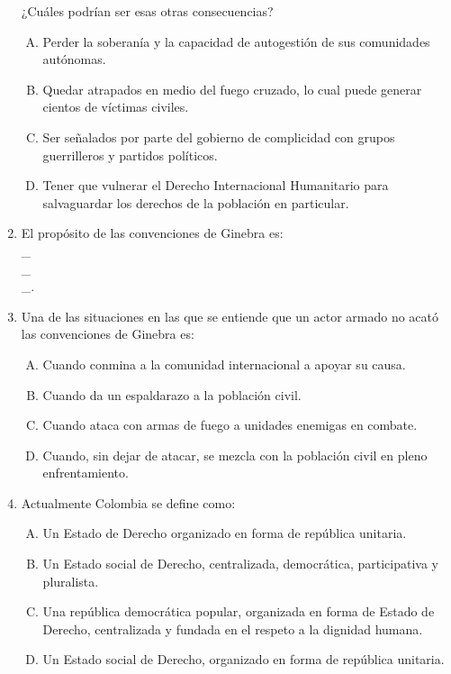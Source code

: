 \begin{enumerate}
¿Cuáles podrían ser esas otras consecuencias?


\begin{enumerate}[(A)]
\item   Perder la soberanía y la capacidad de autogestión de sus comunidades autónomas.
 \item  Quedar atrapados en medio del fuego cruzado, lo cual puede generar cientos de víctimas civiles.
\item Ser señalados por parte del gobierno de complicidad con grupos guerrilleros y partidos políticos.
\item Tener que vulnerar el Derecho Internacional Humanitario para salvaguardar los derechos de la población en particular.
\end{enumerate}



\item El propósito de las convenciones de Ginebra es:\label{sociii-13}\hrulefill\\
\_\hrulefill\\
\_\hrulefill\\
\_\hrulefill.



\item Una de las situaciones en las que se entiende que un actor armado no acató las convenciones de Ginebra es:\label{sociii-14}


\begin{enumerate}[(A)]
\item   Cuando conmina a la comunidad internacional a apoyar su causa.
 \item  Cuando da un espaldarazo a la población civil.
\item Cuando ataca con armas de fuego a unidades enemigas en combate.
\item Cuando, sin dejar de atacar, se mezcla con la población civil en pleno enfrentamiento.
\end{enumerate}



\item Actualmente Colombia se define como:\label{sociii-15}


\begin{enumerate}[(A)]
\item   Un Estado de Derecho organizado en forma de república unitaria.
 \item  Un Estado social de Derecho, centralizada, democrática, participativa y pluralista.
\item Una república democrática popular, organizada en forma de Estado de Derecho, centralizada y fundada en el respeto a la dignidad humana.
\item Un Estado social de Derecho, organizado en forma de república unitaria.
\end{enumerate}



\end{enumerate}
